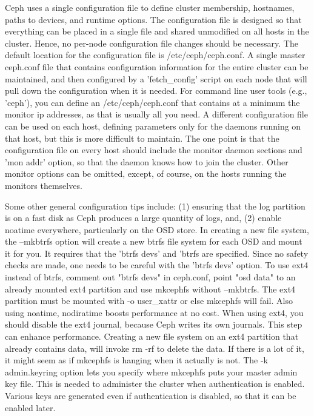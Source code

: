 \documentclass[11pt]{article}
\begin{document}
Ceph uses a single configuration file to define cluster membership, 
hostnames, paths to devices, and runtime options. The configuration 
file is designed so that everything can be placed in a single file and 
shared unmodified on all hosts in the cluster. Hence, no per-node 
configuration file changes should be necessary. The default location 
for the configuration file is /etc/ceph/ceph.conf. A single master 
ceph.conf file that contains configuration information for the entire 
cluster can be maintained, and then configured by  a 'fetch\_config' 
script on each node that will pull down the configuration when it is 
needed. For command line user tools (e.g., 'ceph'), you can define an 
/etc/ceph/ceph.conf that contains at a minimum the monitor ip addresses, 
as that is usually all you need. A different configuration file can be 
used on each host, defining parameters only for the daemons running on 
that host, but this is more difficult to maintain. The one point is that 
the configuration file on every host should include the monitor daemon 
sections and 'mon addr' option, so that the daemon knows how to join the 
cluster. Other monitor options can be omitted, except, of course, on the 
hosts running the monitors themselves.

Some other general configuration tips include: (1) ensuring that the log 
partition is on a fast disk as Ceph produces a large quantity of logs, 
and, (2) enable noatime everywhere, particularly on the OSD store.
In creating a new file system, the --mkbtrfs option will create a new 
btrfs file system for each OSD and mount it for you. It requires that 
the 'btrfs devs' and 'btrfs are specified. Since no safety checks are 
made, one needs to be careful with the 'btrfs devs' option. To use ext4 
instead of btrfs, comment out "btrfs devs" in ceph.conf, point "osd data" 
to an already mounted ext4 partition and use mkcephfs without --mkbtrfs. 
The ext4 partition must be mounted with -o user\_xattr or else mkcephfs 
will fail. Also using noatime, nodiratime boosts performance at no cost. 
When using ext4, you should disable the ext4 journal, because Ceph writes 
its own journals. This step can enhance performance.  Creating a new file 
system on an ext4 partition that already contains data, will invoke rm -rf 
to delete the data. If there is a lot of it, it might seem as if mkcephfs 
is hanging when it actually is not. The -k admin.keyring option lets you 
specify where mkcephfs puts your master admin key file. This is needed to 
administer the cluster when authentication is enabled. Various keys are 
generated even if authentication is disabled, so that it can be enabled 
later. 
\end{document}
